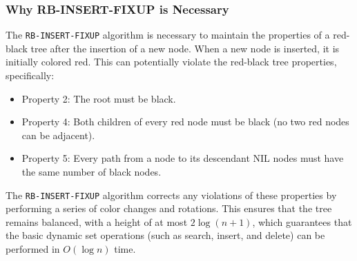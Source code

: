 \subsubsection*{Why RB-INSERT-FIXUP is Necessary}

The \texttt{RB-INSERT-FIXUP} algorithm is necessary to maintain the properties of a red-black tree after the insertion of a new node. When a new node is inserted, it is initially colored red. This can potentially violate the red-black tree properties, specifically:

\begin{itemize}
    \item Property 2: The root must be black.
    \item Property 4: Both children of every red node must be black (no two red nodes can be adjacent).
    \item Property 5: Every path from a node to its descendant NIL nodes must have the same number of black nodes.
\end{itemize}

The \texttt{RB-INSERT-FIXUP} algorithm corrects any violations of these properties by performing a series of color changes and rotations. This ensures that the tree remains balanced, with a height of at most $2\log(n+1)$, which guarantees that the basic dynamic set operations (such as search, insert, and delete) can be performed in $O(\log n)$ time.

